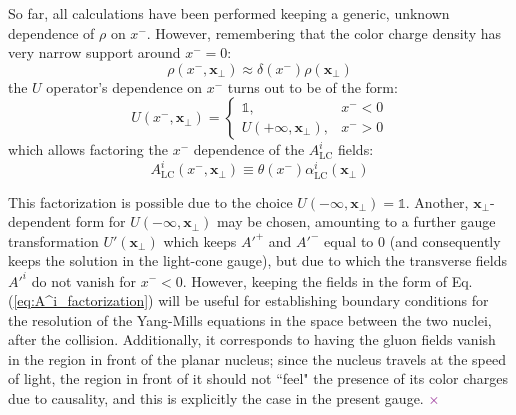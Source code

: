 So far, all calculations have been performed keeping a generic, unknown dependence of $\rho$ on $x^-$. However, remembering that the color charge density has very narrow support around $x^-=0$:
\begin{equation}
	\rho(x^-,\mathbf{x}_\perp) \approx \delta(x^-) \rho(\mathbf{x_\perp})
\label{eq:thin_rho}
\end{equation}
the $U$ operator's dependence on $x^-$ turns out to be of the form:
\begin{equation}
	U(x^-,\mathbf{x}_\perp) =
	\begin{cases}
		\mathds{1}, & x^-<0\\
		U(+\infty,\mathbf{x}_\perp), & x^->0
	\end{cases}
\end{equation}
which allows factoring the $x^-$ dependence of the $A^i_\text{LC}$ fields:
\begin{equation}
	A^i_\text{LC} (x^-, \mathbf{x}_\perp) \equiv \theta(x^-) \alpha^i_\text{LC} (\mathbf{x}_\perp)
\label{eq:A^i_factorization}
\end{equation}


This factorization is possible due to the choice $U(-\infty,\mathbf{x}_\perp) = \mathds{1}$. Another, $\mathbf{x}_\perp$-dependent form for $U(-\infty,\mathbf{x}_\perp)$ may be chosen, amounting to a further gauge transformation $U'(\mathbf{x}_\perp)$ which keeps $A'^+$ and $A'^-$ equal to $0$ (and consequently keeps the solution in the light-cone gauge), but due to which the transverse fields $A'^i$ do not vanish for $x^-<0$. However, keeping the fields in the form of Eq. (\ref{eq:A^i_factorization}) will be useful for establishing boundary conditions for the resolution of the Yang-Mills equations in the space between the two nuclei, after the collision. Additionally, it corresponds to having the gluon fields vanish in the region in front of the planar nucleus; since the nucleus travels at the speed of light, the region in front of it should not ``feel" the presence of its color charges due to causality, and this is explicitly the case in the present gauge. \textcolor{purple}{$\times$}

